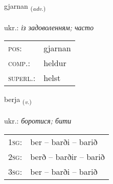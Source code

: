\documentclass[frontgrid, backgrid]{flacards}\usepackage[]{graphicx}\usepackage[]{xcolor}
\begin{document}
\renewcommand{\flhead}{\vskip5pt \fboxsep=0pt {\small\bfseries\footnotesize Atviksorð | прислівник}}
\renewcommand{\fcfoot}{\vskip5pt \fboxsep=0pt \hspace{2pt}{\small\bfseries\footnotesize 1K}}

\renewcommand{\blhead}{\vskip5pt {\small\bfseries\footnotesize Atviksorð | прислівник }}
\renewcommand{\bcfoot}{\vskip5pt \hspace{2pt}{\small\bfseries\footnotesize 1K}}


{gjarnan \small{\textsubscript{(\textit{adv.})}} \\[1ex] %
\textphonetic{[cartnan]} \\
ukr.: \emph{із задоволенням; часто} \\  [2ex]
\renewcommand*{\arraystretch}{0.8}
\begin{tabular}{ll}
\textsc{pos}: & gjarnan \\ 
\textsc{comp.}: & heldur \\ 
\textsc{superl.}: & helst \\
\end{tabular}
}

\renewcommand{\flhead}{\vskip5pt \fboxsep=0pt {\small\bfseries\footnotesize Sagnorð | дієслово}}
\renewcommand{\fcfoot}{\vskip5pt \fboxsep=0pt \hspace{2pt}{\small\bfseries\footnotesize 1K}}

\renewcommand{\blhead}{\vskip5pt {\small\bfseries\footnotesize Sagnorð | дієслово }}
\renewcommand{\bcfoot}{\vskip5pt \hspace{2pt}{\small\bfseries\footnotesize 1K}}


{berja \small{\textsubscript{(\textit{v.})}} \\[1ex] %
\textphonetic{[pɛrja]} \\
ukr.: \emph{боротися; бити} \\  [2ex]
\renewcommand*{\arraystretch}{0.8}
\begin{tabular}{p{1cm}l}
\textsc{1sg}: & ber -- barði -- barið \\ 
\textsc{2sg}: & berð -- barðir -- barið \\ 
\textsc{3sg}: & ber -- barði -- barið \\ 
\end{tabular}
}
\end{document}
